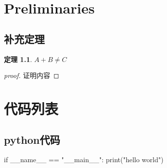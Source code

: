 \documentclass[notitlepage,cs4size,punct,oneside]{ctexrep}
\numberwithin{equation}{chapter}
\theoremstyle{mystyle}
\newtheorem{theorem}[definition]{\hspace{2em}定理}
\def\theequation{\arabic{chapter}.\arabic{equation}}
\def\thedefinition{\arabic{chapter}.\arabic{definition}.}
\begin{document}
\begin{appendices}
    \renewcommand{\thechapter}{\Alph{chapter}}
    \def\theequation{\Alph{chapter}.\arabic{equation}}
    \def\thedefinition{\Alph{chapter}.\arabic{definition}.}
    \chapter{Preliminaries}
    \section{补充定理}
    \begin{theorem}\label{appendix}
        $A + B \neq C$
    \end{theorem}
    \begin{proof}[proof]
        证明内容
    \end{proof}
    \chapter{代码列表}
    \section{python代码}
    \begin{python}
if __name__ == "__main__":
    print("hello world")
    \end{python}
\end{appendices}


%
\end{document}
